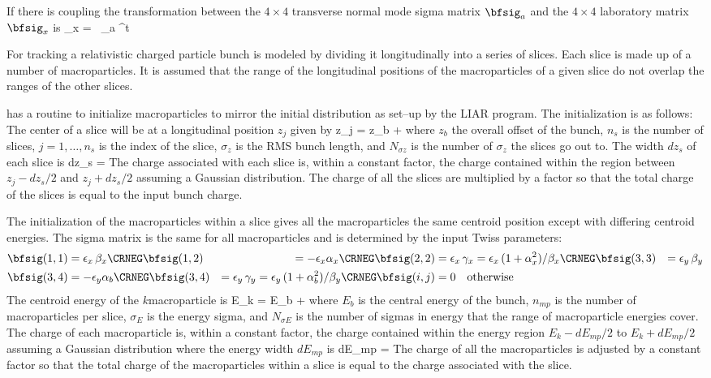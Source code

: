 If there is coupling the transformation between the $4\times 4$
transverse normal mode sigma matrix $\bfsig_a$ and the $4\times 4$
laboratory matrix $\bfsig_x$ is
\Begineq
  \bfsig_x = \bfV \, \bfsig_a \bfV^t
\Endeq

For tracking a relativistic charged particle bunch is modeled by dividing it
longitudinally into a series of slices. Each slice is made up of a
number of macroparticles. It is assumed that the range of the
longitudinal positions of the macroparticles of a given slice do not
overlap the ranges of the other slices.

\bmad has a routine to initialize macroparticles to mirror the initial
distribution as set--up by the LIAR program\cite{b:liar}. The
initialization is as follows: The center of a
slice will be at a longitudinal position $z_j$ given by
\Begineq
  z_j = z_b + 
\Endeq
where $z_b$ the overall offset of the bunch, 
$n_s$ is the number of slices, $j = 1, \ldots,
n_s$ is the index of the slice, $\sigma_z$ is the RMS bunch length,
and $N_{\sigma z}$ is the number of $\sigma_z$ the slices go out
to. The width $dz_s$ of each slice is
\Begineq
    dz_s = 
\Endeq
The charge associated with each slice is, within a constant factor,
the charge contained within the region between $z_j - dz_s/2$ and $z_j
+ dz_s/2$ assuming a Gaussian distribution.  The charge of all the
slices are multiplied by a factor so that the total charge of the
slices is equal to the input bunch charge.

The initialization of the macroparticles within a slice gives all the
macroparticles the same centroid position except with differing
centroid energies. 
The sigma matrix is the same for all macroparticles and is
determined by the input Twiss parameters:
\begin{align}
  \bfsig(1,1) &= \epsilon_x \, \beta_x \CRNEG
  \bfsig(1,2) &= -\epsilon_x \alpha_x  \CRNEG
  \bfsig(2,2) &= \epsilon_x \, \gamma_x = 
      \epsilon_x \, (1 + \alpha_x^2) / \beta_x \CRNEG
  \bfsig(3,3) &= \epsilon_y \, \beta_y \\
  \bfsig(3,4) &= -\epsilon_y \alpha_b \CRNEG
  \bfsig(3,4) &= \epsilon_y \, \gamma_y = 
      \epsilon_y \, (1 + \alpha_b^2) / \beta_y \CRNEG
  \bfsig(i,j) &= 0 \quad \mbox{otherwise} \nonumber
\end{align}
The centroid energy of the $k$\Th macroparticle is
\Begineq
  E_k = E_b + 
\Endeq
where $E_b$ is the central energy of the bunch, $n_{mp}$ is the number
of macroparticles per slice, $\sigma_E$ is the energy sigma, and
$N_{\sigma E}$ is the number of sigmas in energy that the range of
macroparticle energies cover. The charge of each macroparticle is,
within a constant factor, the charge contained within the energy
region $E_k - dE_{mp}/2$ to $E_k + dE_{mp}/2$ assuming a Gaussian
distribution where the energy width $dE_{mp}$ is
\Begineq
  dE_{mp} = 
\Endeq
The charge of all the macroparticles is adjusted by a constant factor
so that the total charge of the macroparticles within a slice is equal
to the charge associated with the slice.

